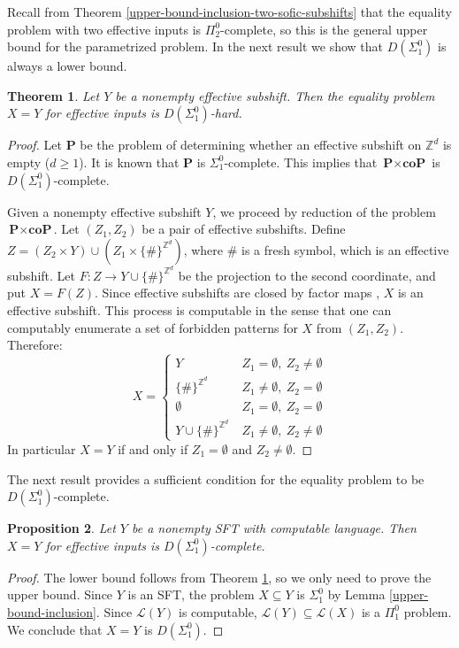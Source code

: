 \documentclass[a4paper]{article}
\newcommand{\Le}{\mathcal{L}}
\newcommand{\Z}{\mathbb{Z}}
\newtheorem{theorem}{Theorem}[section]
\newtheorem{proposition}[theorem]{Proposition}
\theoremstyle{definition}
\begin{document}
Recall from Theorem \ref{upper-bound-inclusion-two-sofic-subshifts} that the equality problem with two effective inputs is $\Pi_2^0$-complete, so this is the general upper bound for the parametrized problem. In the next result we show that  $D(\Sigma_1^0)$ is always a lower bound.
\begin{theorem}\label{complexity-equality-problem}
    Let $Y$ be a nonempty effective subshift. Then the equality problem $X=Y$ for effective inputs is $D(\Sigma^0_1)$-hard.
\end{theorem}
\begin{proof} 
Let $\textbf{P}$ be the problem of determining whether an effective subshift on $\Z^d$ is empty ($d \geq 1$). It is known that $\textbf{P}$ is $\Sigma_1^0$-complete. This implies that $\textbf{P}\times \textbf{coP}$ is $D(\Sigma_1^0)$-complete. 

Given a nonempty effective subshift $Y$, we proceed by reduction of the problem $\textbf{P}\times \textbf{coP}$. Let $(Z_1,Z_2)$ be a pair of effective subshifts. Define $Z=(Z_2\times Y) \cup (Z_1\times \{\#\}^{\Z^d})$, where $\#$ is a fresh symbol, which is an effective subshift. Let $F\colon Z\to Y\cup\{\#\}^{\Z^d}$ be the projection to the second coordinate, and put $X=F(Z)$. Since effective subshifts are closed by factor maps \cite{aubrun_notion_2017}, $X$ is an effective subshift. This process is computable in the sense that one can computably enumerate a set of forbidden patterns for $X$ from $(Z_1,Z_2)$. Therefore:
    \[X=\begin{cases}
        Y \ &Z_1 =\emptyset, \ Z_2 \ne \emptyset \\
        \{\#\}^{\Z^d} \ &Z_1 \ne\emptyset, \ Z_2=\emptyset\\
        \emptyset \ &Z_1=\emptyset, \ Z_2=\emptyset \\
        Y \cup \{\#\}^{\Z^d} \ & Z_1\ne\emptyset, \ Z_2\ne\emptyset 
    \end{cases}\]
    In particular $X=Y$ if and only if $Z_1=\emptyset$ and $Z_2\ne\emptyset$. 
\end{proof}
The next result provides a sufficient condition for the equality problem to be $D(\Sigma_1^0)$-complete. 
\begin{proposition}\label{equality-for-sft-with-computable-language}
    Let $Y$ be a nonempty SFT  with computable language. Then $X=Y$ for effective inputs is $D(\Sigma^0_1)$-complete.
\end{proposition}
\begin{proof}
The lower bound  follows from Theorem \ref{complexity-equality-problem}, so we only need to prove the upper bound.  Since $Y$ is an SFT, the problem $X \subseteq Y$ is $\Sigma^0_1$ by Lemma \ref{upper-bound-inclusion}. Since $\Le(Y)$ is computable, $\Le(Y) \subseteq \Le(X)$ is a  $\Pi^0_1$ problem. We conclude that $X=Y$ is $D(\Sigma^0_1)$.
\end{proof}
\end{document}
